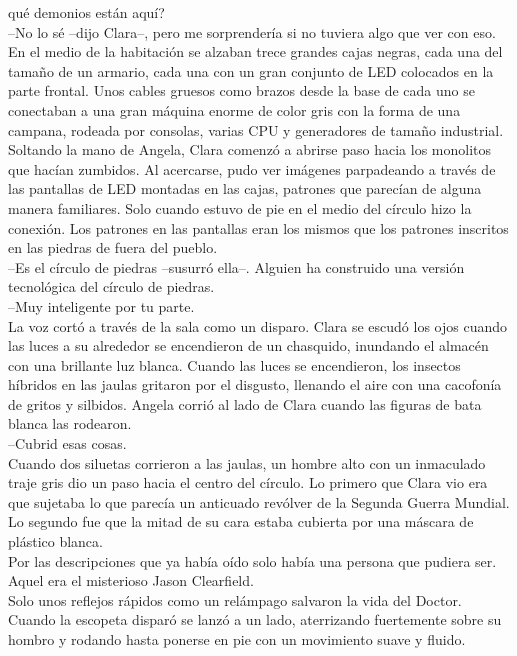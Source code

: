 qué demonios están aquí?\\
--No lo sé --dijo Clara--, pero me sorprendería si no tuviera algo que
ver con eso.\\
En el medio de la habitación se alzaban trece grandes cajas negras, cada
una del tamaño de un armario, cada una con un gran conjunto de LED
colocados en la parte frontal. Unos cables gruesos como brazos desde la
base de cada uno se conectaban a una gran máquina enorme de color gris
con la forma de una campana, rodeada por consolas, varias CPU y
generadores de tamaño industrial.\\
Soltando la mano de Angela, Clara comenzó a abrirse paso hacia los
monolitos que hacían zumbidos. Al acercarse, pudo ver imágenes
parpadeando a través de las pantallas de LED montadas en las cajas,
patrones que parecían de alguna manera familiares. Solo cuando estuvo de
pie en el medio del círculo hizo la conexión. Los patrones en las
pantallas eran los mismos que los patrones inscritos en las piedras de
fuera del pueblo.\\
--Es el círculo de piedras --susurró ella--. Alguien ha construido una
versión tecnológica del círculo de piedras.\\
--Muy inteligente por tu parte.\\
La voz cortó a través de la sala como un disparo. Clara se escudó los
ojos cuando las luces a su alrededor se encendieron de un chasquido,
inundando el almacén con una brillante luz blanca. Cuando las luces se
encendieron, los insectos híbridos en las jaulas gritaron por el
disgusto, llenando el aire con una cacofonía de gritos y silbidos.
Angela corrió al lado de Clara cuando las figuras de bata blanca las
rodearon.\\
--Cubrid esas cosas.\\
Cuando dos siluetas corrieron a las jaulas, un hombre alto con un
inmaculado traje gris dio un paso hacia el centro del círculo. Lo
primero que Clara vio era que sujetaba lo que parecía un anticuado
revólver de la Segunda Guerra Mundial. Lo segundo fue que la mitad de su
cara estaba cubierta por una máscara de plástico blanca.\\
Por las descripciones que ya había oído solo había una persona que
pudiera ser.\\
Aquel era el misterioso Jason Clearfield.\\[2\baselineskip]Solo unos
reflejos rápidos como un relámpago salvaron la vida del Doctor. Cuando
la escopeta disparó se lanzó a un lado, aterrizando fuertemente sobre su
hombro y rodando hasta ponerse en pie con un movimiento suave y fluido.
